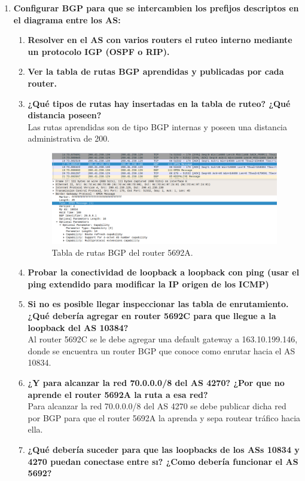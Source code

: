\documentclass[letterpaper,12pt]{article}
\begin{document}
\begin{enumerate}
		\item \textbf{Configurar BGP para que se intercambien los prefijos descriptos en el diagrama entre los AS:}
		\begin{enumerate}
			\item \textbf{Resolver en el AS con varios routers el ruteo interno mediante un protocolo IGP (OSPF o RIP).}
			\item \textbf{Ver la tabla de rutas BGP aprendidas y publicadas por cada router.}
			\item \textbf{¿Qué tipos de rutas hay insertadas en la tabla de ruteo? ¿Qué distancia poseen?}\\
			Las rutas aprendidas son de tipo BGP internas y poseen una distancia administrativa de 200.
			
			\begin{figure}[H]
				\centering \includegraphics[width=1\columnwidth]{figure/bgp-open.png}
				\caption{
					\label{fig:samplesetup} %
					Tabla de rutas BGP del router 5692A.
				}
			\end{figure}
			
			\item \textbf{Probar la conectividad de loopback a loopback con ping (usar el ping extendido para modificar la IP origen de los ICMP)}
			\item \textbf{Si no es posible llegar inspeccionar las tabla de enrutamiento. ¿Qué debería agregar en router 5692C para que llegue a la loopback del AS 10384?}\\
			Al router 5692C se le debe agregar una default gateway a 163.10.199.146, donde se encuentra un router BGP que conoce como enrutar hacia el AS 10834.
			\item \textbf{¿Y para alcanzar la red 70.0.0.0/8 del AS 4270? ¿Por que no aprende el router 5692A la ruta a esa red?}\\
			Para alcanzar la red 70.0.0.0/8 del AS 4270 se debe publicar dicha red por BGP para que el router 5692A la aprenda y sepa routear tráfico hacia ella.
			\item \textbf{¿Qué debería suceder para que las loopbacks de los ASs 10834 y 4270 puedan conectase entre sı? ¿Como debería funcionar el AS 5692?}
		\end{enumerate}
		

\end{enumerate}
\end{document}

